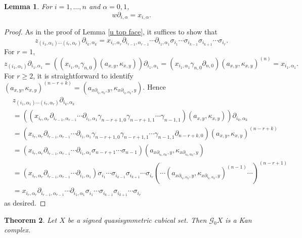 \documentclass[oneside, 12pt]{amsart}
\numberwithin{equation}{section}
\theoremstyle{plain}
\newtheorem{theorem}{Theorem}[section]
\newtheorem{lemma}[theorem]{Lemma}
\theoremstyle{definition}
\theoremstyle{remark}
\begin{document}
	
	
	\begin{lemma}
		\label{u side face}
		For $i=1,\ldots,n$ and $\alpha=0,1$,
		\[
		w\partial_{i,\alpha}=x_{i,\alpha}.
		\]
	\end{lemma}
	
	\begin{proof}
		As in the proof of Lemma \ref{u top face}, it suffices to show that
		\[
		z_{(i_1,\alpha_1)\cdots(i_r,\alpha_r)}\partial_{i_k,\alpha_k}=x_{i_r,\alpha_r}\partial_{i_{r-1},\alpha_{r-1}}\cdots\partial_{i_1,\alpha_1}\sigma_{i_1}\cdots\sigma_{i_{k-1}}\sigma_{i_{k+1}}\cdots\sigma_{i_r}.
		\]
		For $r=1$,
		\[
		z_{(i_1,\alpha_1)}\partial_{i_1,\alpha_1}=((x_{i_1,\alpha_1}\gamma_{n,0})(a_{x,y},\kappa_{x,y}))\partial_{i_1,\alpha_1}=(x_{i_1,\alpha_1}\gamma_{n,0}\partial_{n,0})(a_{x,y},\kappa_{x,y})^{(n)}=x_{i_1,\alpha_1}.
		\]
		For $r\ge 2$, it is straightforward to identify $(a_{x,y},\kappa_{x,y})^{(n-r+k)}=(a_{x\partial_{i_k,\alpha_k},y},\kappa_{x\partial_{i_k,\alpha_k},y})$. Hence
		\begin{align*}
			&z_{(i_1,\alpha_1)\cdots(i_r,\alpha_r)}\partial_{i_k,\alpha_k}\\
			&=((x_{i_r,\alpha_r}\partial_{i_{r-1},\alpha_{r-1}}\cdots\partial_{i_1,\alpha_1}\gamma_{n-r+1,0}\gamma_{n-r+1,1}\cdots\gamma_{n-1,1})(a_{x,y},\kappa_{x,y}))\partial_{i_k,\alpha_k}\\
			&=(x_{i_r,\alpha_r}\partial_{i_{r-1},\alpha_{r-1}}\cdots\partial_{i_1,\alpha_1}\gamma_{n-r+1,0}\gamma_{n-r+1,1}\cdots\gamma_{n-1,1}\partial_{n-r+k,0})(a_{x,y},\kappa_{x,y})^{(n-r+k)}\\
			&=(x_{i_r,\alpha_r}\partial_{i_{r-1},\alpha_{r-1}}\cdots\partial_{i_1,\alpha_1}\sigma_{n-r+1}\cdots\sigma_{n-1})(a_{x\partial_{i_k,\alpha_k},y},\kappa_{x\partial_{i_k,\alpha_k},y})\\
			&=(x_{i_r,\alpha_r}\partial_{i_{r-1},\alpha_{r-1}}\cdots\partial_{i_1,\alpha_1})\sigma_{i_1}\cdots\sigma_{i_{k-1}}\sigma_{i_{k+1}}\cdots\sigma_{i_r}(\cdots(a_{x\partial_{i_k,\alpha_k},y},\kappa_{x\partial_{i_k,\alpha_k},y})^{(n-1)}\cdots)^{(n-r+1)}\\
			&=x_{i_r,\alpha_r}\partial_{i_{r-1},\alpha_{r-1}}\cdots\partial_{i_1,\alpha_1}\sigma_{i_1}\cdots\sigma_{i_{k-1}}\sigma_{i_{k+1}}\cdots\sigma_{i_r}
		\end{align*}
		as desired.
	\end{proof}
	
	
	
	\begin{theorem}
		\label{Kan complex}
		Let $X$ be a signed quasisymmetric cubical set. Then $\mathcal{G}_0X$ is a Kan complex.
	\end{theorem}
	
\end{document}
